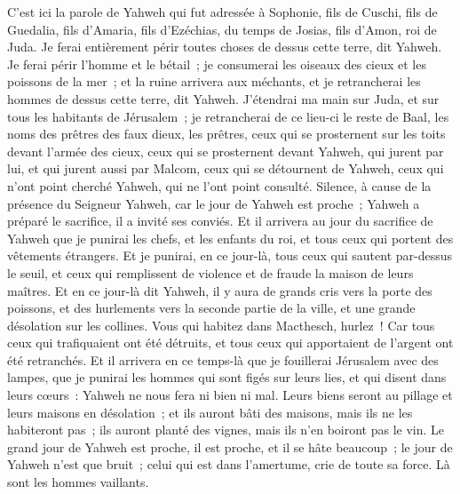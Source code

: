 \begin{multicols}{2}
\VerseOne{}C'est ici la parole de Yahweh qui fut adressée à Sophonie, fils de Cuschi, fils de Guedalia, fils d'Amaria, fils d'Ezéchias, du temps de Josias, fils d'Amon, roi de Juda.
Je ferai entièrement périr toutes choses de dessus cette terre, dit Yahweh.
Je ferai périr l'homme et le bétail~; je consumerai les oiseaux des cieux et les poissons de la mer~; et la ruine arrivera aux méchants, et je retrancherai les hommes de dessus cette terre, dit Yahweh.
J'étendrai ma main sur Juda, et sur tous les habitants de Jérusalem~; je retrancherai de ce lieu-ci le reste de Baal, les noms des prêtres des faux dieux, les prêtres,
ceux qui se prosternent sur les toits devant l'armée des cieux, ceux qui se prosternent devant Yahweh, qui jurent par lui, et qui jurent aussi par Malcom,
ceux qui se détournent de Yahweh, ceux qui n'ont point cherché Yahweh, qui ne l'ont point consulté.
Silence, à cause de la présence du Seigneur Yahweh, car le jour de Yahweh est proche~; Yahweh a préparé le sacrifice, il a invité ses conviés.
Et il arrivera au jour du sacrifice de Yahweh que je punirai les chefs, et les enfants du roi, et tous ceux qui portent des vêtements étrangers.
Et je punirai, en ce jour-là, tous ceux qui sautent par-dessus le seuil, et ceux qui remplissent de violence et de fraude la maison de leurs maîtres.
Et en ce jour-là dit Yahweh, il y aura de grands cris vers la porte des poissons, et des hurlements vers la seconde partie de la ville, et une grande désolation sur les collines.
Vous qui habitez dans Macthesch, hurlez~! Car tous ceux qui trafiquaient ont été détruits, et tous ceux qui apportaient de l'argent ont été retranchés.
Et il arrivera en ce temps-là que je fouillerai Jérusalem avec des lampes, que je punirai les hommes qui sont figés sur leurs lies, et qui disent dans leurs cœurs~: Yahweh ne nous fera ni bien ni mal.
Leurs biens seront au pillage et leurs maisons en désolation~; et ils auront bâti des maisons, mais ils ne les habiteront pas~; ils auront planté des vignes, mais ils n'en boiront pas le vin.
Le grand jour de Yahweh est proche, il est proche, et il se hâte beaucoup~; le jour de Yahweh n'est que bruit~; celui qui est dans l'amertume, crie de toute sa force. Là sont les hommes vaillants.

\end{multicols}
